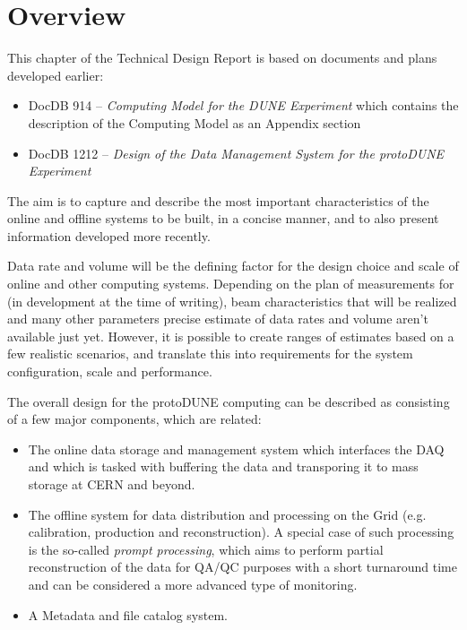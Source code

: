\section{Overview}

This chapter of the Technical Design Report is based on documents and plans developed earlier:
\begin{itemize}
\item DocDB 914 --  \textit{Computing Model for the DUNE Experiment}  which contains the
description of the \pd Computing Model as an Appendix section

\item DocDB 1212 -- \textit{Design of the Data Management System for the
protoDUNE Experiment}

\end{itemize}

\noindent The aim is to capture and describe the most important characteristics of the online and offline systems to be built, in a concise manner,
and to also present information developed more recently.

Data rate and volume will be the defining factor for the design choice and scale of \pd
online and other computing systems. Depending on the plan of measurements for \pd
(in development at the time of writing), beam characteristics that will be realized
and many other parameters precise estimate of data rates and volume aren't available just yet. However, it is possible to create ranges
of estimates based on a few realistic scenarios, and translate this into requirements for the system configuration, scale and
performance.

The overall design for the protoDUNE computing can be described as consisting of a few major components, which are related:
\begin{itemize}

\item The online data storage and management system which interfaces the DAQ and which is tasked with buffering
the data and transporing it to mass storage at CERN and beyond.

\item The offline system for data distribution and processing on the Grid (e.g. calibration, production and reconstruction). A special case
of such processing is the so-called \textit{prompt processing}, which aims to perform partial reconstruction of the data for QA/QC purposes
with a short turnaround time and can be considered a more advanced type of monitoring.

\item  A Metadata and file catalog system.
\end{itemize}




